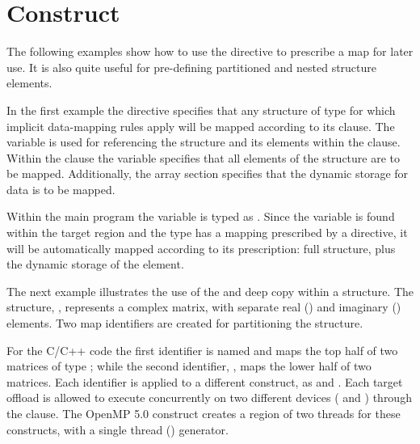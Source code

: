 \pagebreak
\section{  Construct}
\label{sec:declare_mapper}

The following examples show how to use the 
directive to prescribe a map for later use.
It is also quite useful for pre-defining partitioned and nested 
structure elements.

In the first example the  directive specifies 
that any structure of type  for which implicit data-mapping
rules apply will be mapped according to its  clause.
The variable  is used for referencing the structure and its 
elements within the  clause. 
Within the  clause the  variable specifies that all
elements of the structure are to be mapped.  Additionally, the
array section  specifies that the dynamic 
storage for data is to be mapped. 

Within the main program the  variable is typed as .
Since the variable is found within the target region and the type has a mapping prescribed by
a  directive, it will be automatically mapped according to its prescription: 
full structure, plus the dynamic storage of the  element. 




\pagebreak
The next example illustrates the use of the  and deep copy within a structure. 
The structure, ,  represents a complex matrix, 
with separate real () and imaginary () elements.
Two map identifiers are created for partitioning the  structure.

For the C/C++ code the first identifier is named  and maps the top half of
two matrices of type ; while the second identifier, ,
maps the lower half of two matrices. 
Each identifier is applied to a different  construct,
as   
and .
Each target offload is allowed to execute concurrently on two different devices 
( and ) through the  clause.
The OpenMP 5.0  construct creates a region of two threads
for these  constructs, with a single thread () generator.

